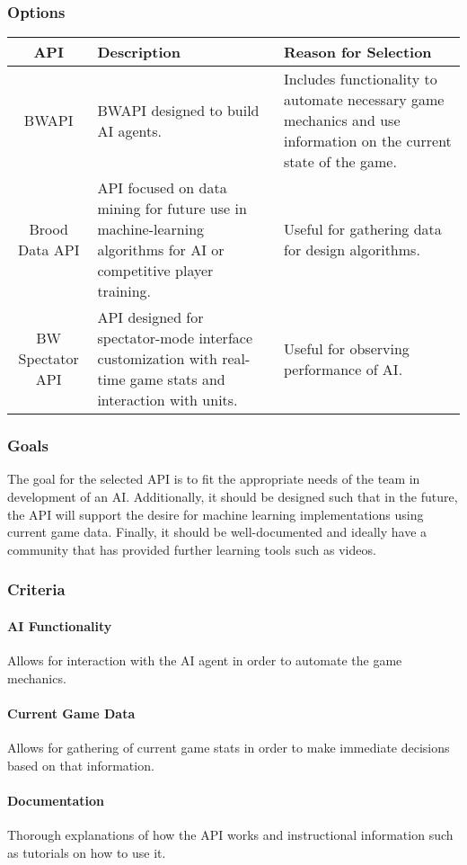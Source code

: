 \subsubsection{Options}
\begin{center}
	\begin{tabular}{ ||C|L|L|| } 
		\hline
		API & Description & Reason for Selection \\
		\hline
		BWAPI & BWAPI designed to build AI agents. & Includes functionality to automate necessary game mechanics and use information on the current state of the game. \\ 
		\hline
		Brood Data API & API focused on data mining for future use in machine-learning algorithms for AI or competitive player training. & Useful for gathering data for design algorithms.\\ 
		\hline
		 BW Spectator API & API designed for spectator-mode interface customization with real-time game stats and interaction with units. & Useful for observing performance of AI. \\ 
		\hline
	\end{tabular}
\end{center}
\subsubsection{Goals}
	The goal for the selected API is to fit the appropriate needs of the team in development of an AI. Additionally, it should be designed such that in the future, the API will support the desire for machine learning implementations using current game data. Finally, it should be well-documented and ideally have a community that has provided further learning tools such as videos.
\subsubsection{Criteria}
	\paragraph{AI Functionality}
	Allows for interaction with the AI agent in order to automate the game mechanics.
	\paragraph{Current Game Data}
	Allows for gathering of current game stats in order to make immediate decisions based on that information.
	\paragraph{Documentation}
	Thorough explanations of how the API works and instructional information such as tutorials on how to use it.
